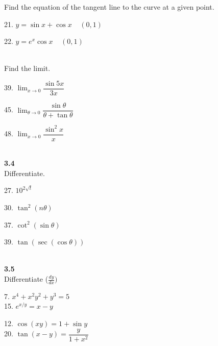 \documentclass{letter}
\begin{document}
\begin{itemize}
		Find the equation of the tangent line to the curve at a given point.\\
		\begin{minipage}[t]{0.5\textwidth}
			21. $y = \sin x + \cos x \;\;\;\; (0, 1)$
		\end{minipage}
		\begin{minipage}[t]{0.5\textwidth}
			22. $y = e^x \cos x \;\;\;\; (0, 1)$\\
		\end{minipage}\\
		
		Find the limit.\\
		\begin{minipage}[t]{0.3\textwidth}
			39. $\displaystyle \lim_{x \to 0} \dfrac{\sin 5x}{3x}$
		\end{minipage}
		\begin{minipage}[t]{0.3\textwidth}
			45. $\displaystyle \lim_{\theta \to 0} \dfrac{\sin \theta}{\theta + \tan \theta}$
		\end{minipage}
		\begin{minipage}[t]{0.3\textwidth}
			48. $\displaystyle \lim_{x \to 0} \dfrac{\sin^2 x}{x}$\\
		\end{minipage}\\
		
		\textbf{3.4}\\
		
		Differentiate.\\
		\begin{minipage}[t]{0.2\textwidth}
			27. $10^{2\sqrt t}$\\
		\end{minipage}
		\begin{minipage}[t]{0.2\textwidth}
			30. $\tan^2(n \theta)$
		\end{minipage}
		\begin{minipage}[t]{0.2\textwidth}
			37. $\cot^2(\sin \theta)$\\
		\end{minipage}
		\begin{minipage}[t]{0.2\textwidth}
			39. $\tan(\sec(\cos \theta))$
		\end{minipage}\\
		
		\textbf{3.5}\\
		
		Differentiate ($\frac{dy}{dx})$\\
		\begin{minipage}[t]{0.5\textwidth}
			7. $x^4 + x^2y^2 + y^3 = 5$\\
			15. $e^{x/y} = x - y$
		\end{minipage}
		\begin{minipage}[t]{0.5\textwidth}
			12. $\cos (xy) = 1 + \sin y$\\
			20. $\tan(x - y) = \dfrac{y}{1+x^2}$\\
		\end{minipage}\\
		

\end{itemize}
\end{document}
